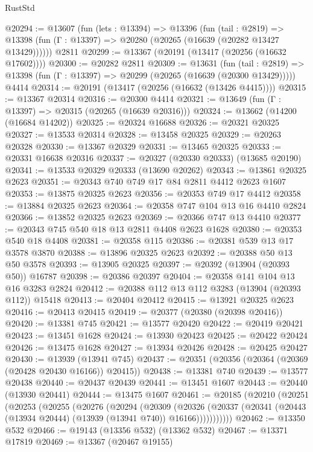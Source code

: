 \begin{lexlean}{RustStd}
\begin{coremodule}
@20294 := @13607
    (fun (lets : @13394) =>
    @13396
      (fun (tail : @2819) =>
      @13398 (fun (Γ : @13397) => @20280 (@20265 (@16639 (@20282 @13427 @13429))))))
    @2811
@20299 := @13367 (@20191 (@13417 (@20256 (@16632 @17602))))
@20300 := @20282 @2811
@20309 := @13631
    (fun (tail : @2819) => @13398 (fun (Γ : @13397) => @20299 (@20265 (@16639 (@20300 @13429)))))
    @4414
@20314 := @20191 (@13417 (@20256 (@16632 (@13426 @4415))))
@20315 := @13367 @20314
@20316 := @20300 @4414
@20321 := @13649 (fun (Γ : @13397) => @20315 (@20265 (@16639 @20316)))
@20324 := @13662 (@14200 (@16684 @14202))
@20325 := @20324 @16688
@20326 := @20321 @20325
@20327 := @13533 @20314
@20328 := @13458 @20325
@20329 := @20263 @20328
@20330 := @13367 @20329
@20331 := @13465 @20325
@20333 := @20331 @16638 @20316
@20337 := @20327 (@20330 @20333) (@13685 @20190)
@20341 := @13533 @20329 @20333 (@13690 @20262)
@20343 := @13861 @20325 @2623
@20351 := @20343 @740 @749 @17 @84 @2811 @4412 @2623 @1607
@20353 := @13875 @20325 @2623
@20356 := @20353 @749 @17 @4412
@20358 := @13884 @20325 @2623
@20364 := @20358 @747 @104 @13 @16 @4410 @2824
@20366 := @13852 @20325 @2623
@20369 := @20366 @747 @13 @4410
@20377 := @20343 @745 @540 @18 @13 @2811 @4408 @2623 @1628
@20380 := @20353 @540 @18 @4408
@20381 := @20358 @115
@20386 := @20381 @539 @13 @17 @3578 @3870
@20388 := @13896 @20325 @2623
@20392 := @20388 @50 @13 @50 @3578
@20393 := @13905 @20325
@20397 := @20392 (@13904 (@20393 @50)) @16787
@20398 := @20386 @20397
@20404 := @20358 @141 @104 @13 @16 @3283 @2824
@20412 := @20388 @112 @13 @112 @3283 (@13904 (@20393 @112)) @15418
@20413 := @20404 @20412
@20415 := @13921 @20325 @2623
@20416 := @20413 @20415
@20419 := @20377 (@20380 (@20398 @20416))
@20420 := @13381 @745
@20421 := @13577 @20420
@20422 := @20419 @20421
@20423 := @13451 @1628
@20424 := @13930 @20423
@20425 := @20422 @20424
@20426 := @13475 @1628
@20427 := @13934 @20426
@20428 := @20425 @20427
@20430 := @13939 (@13941 @745)
@20437 := @20351 (@20356 (@20364 (@20369 (@20428 @20430 @16166)) @20415))
@20438 := @13381 @740
@20439 := @13577 @20438
@20440 := @20437 @20439
@20441 := @13451 @1607
@20443 := @20440 (@13930 @20441)
@20444 := @13475 @1607
@20461 := @20185
    (@20210
      (@20251
        (@20253
          (@20255
            (@20276
              (@20294
                (@20309
                  (@20326
                    (@20337 (@20341 (@20443 (@13934 @20444) (@13939 (@13941 @740)) @16166)))))))))))
@20462 := @13350 @532
@20466 := @19143 (@13356 @532) (@13362 @532)
@20467 := @13371 @17819
@20469 := @13367 (@20467 @19155)

\end{coremodule}
\end{lexlean}
